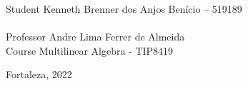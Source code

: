 \vspace{25pt}

\begin{flushleft}
	\begin{tabbing}
		Student \qquad Kenneth Brenner dos Anjos Benício – 519189\\
	   \qquad\qquad\qquad\= \\
		Professor\> Andre Lima Ferrer de Almeida \\
		Course \> Multilinear Algebra - TIP8419\\
	\end{tabbing}
\end{flushleft}

\vspace{25pt}

\begin{center}
    Fortaleza, 2022
\end{center}